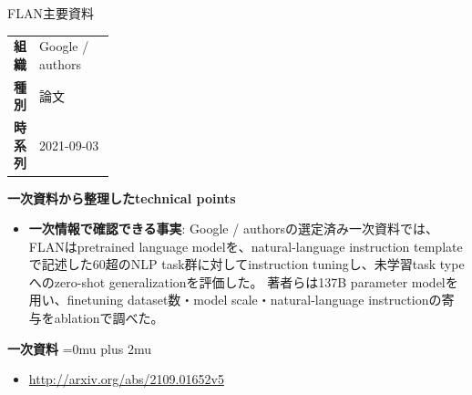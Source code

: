 \begin{technicalnote}{FLAN}{主要資料}
\begingroup
\begin{tabularx}{\linewidth}{@{}>{\bfseries}p{0.22\linewidth}X@{}}
組織 & Google / authors \\
種別 & 論文 \\
時系列 & 2021-09-03 \\
\end{tabularx}
\smallskip
{\bfseries 一次資料から整理したtechnical points}
\begin{itemize}[leftmargin=1.5em,itemsep=0.35em]
\item \textbf{一次情報で確認できる事実}: Google / authorsの選定済み一次資料では、FLANはpretrained language modelを、natural-language instruction templateで記述した60超のNLP task群に対してinstruction tuningし、未学習task typeへのzero-shot generalizationを評価した。 著者らは137B parameter modelを用い、finetuning dataset数・model scale・natural-language instructionの寄与をablationで調べた。
\end{itemize}
\begin{minipage}{\linewidth}
\begin{samepage}
{\bfseries 一次資料}
\begingroup\sloppy
\Urlmuskip=0mu plus 2mu\relax
\begin{itemize}[leftmargin=1.5em,itemsep=0.25em]
\item {\scriptsize\url{http://arxiv.org/abs/2109.01652v5}}
\end{itemize}
\endgroup
\end{samepage}
\end{minipage}
\endgroup
\end{technicalnote}
\medskip

